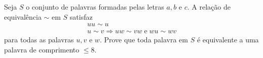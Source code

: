 Seja \(S\) o conjunto de palavras formadas pelas letras \(a, b\) e \(c\). A relação de equivalência \(\sim\) em \(S\) satisfaz
\begin{gather*}
uu \sim u \\
u \sim v \Rightarrow uw \sim vw \; \text{e} \; wu \sim wv
\end{gather*}
para todas as palavras \(u, v\) e \(w\). Prove que toda palavra em \(S\) é equivalente a uma palavra de comprimento \(\leq 8\).
